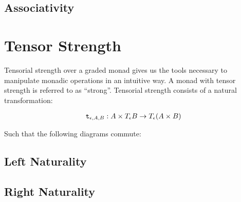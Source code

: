 \documentclass{Report}
\begin{document}
\subsection{Associativity}


\section{Tensor Strength}
Tensorial strength over a graded monad gives us the tools necessary to manipulate monadic operations in an intuitive way. A monad with tensor strength is referred to as ``strong''. Tensorial strength consists of a natural transformation:

\begin{align}
    \texttt{t}_{\epsilon, A, B}: A \times T_{\epsilon}{B} \rightarrow T_{\epsilon}{(A \times B)}
\end{align}

Such that the following diagrams commute:
\subsection{Left Naturality}

\subsection{Right Naturality}

\end{document}
